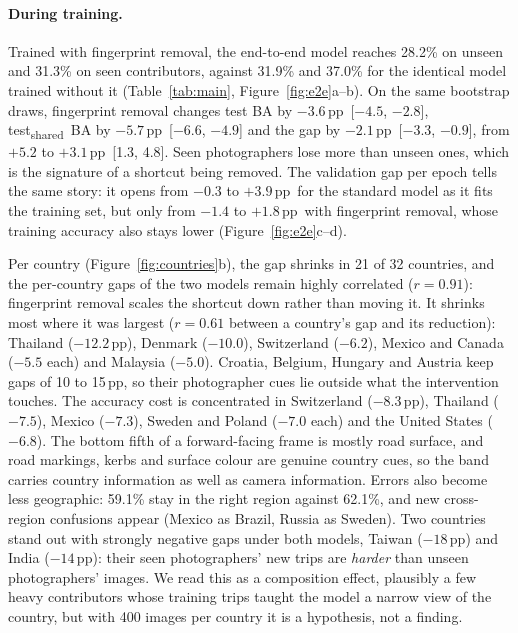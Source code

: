 \documentclass[clean,twocolumn]{bam-project}
\newcommand{\tsh}{test\textsubscript{shared}}
\newcommand{\pp}{\,pp}
\begin{document}
\paragraph{During training.} Trained with fingerprint removal, the end-to-end model reaches 28.2\% on
unseen and 31.3\% on seen contributors, against 31.9\% and 37.0\% for the identical model trained without
it (Table~\ref{tab:main}, Figure~\ref{fig:e2e}a--b). On the same bootstrap draws, fingerprint removal changes
test BA by $-3.6$\pp\ [$-4.5$, $-2.8$], \tsh\ BA by $-5.7$\pp\ [$-6.6$, $-4.9$] and the gap by $-2.1$\pp\
[$-3.3$, $-0.9$], from $+5.2$ to $+3.1$\pp\ [1.3, 4.8]. Seen photographers lose more than unseen ones, which is
the signature of a shortcut being removed. The validation gap per epoch tells the same story: it opens
from $-0.3$ to $+3.9$\pp\ for the standard model as it fits the training set, but only from $-1.4$ to
$+1.8$\pp\ with fingerprint removal, whose training accuracy also stays lower (Figure~\ref{fig:e2e}c--d).

Per country (Figure~\ref{fig:countries}b), the gap shrinks in 21 of 32 countries, and the per-country gaps
of the two models remain highly correlated ($r=0.91$): fingerprint removal scales the shortcut down rather
than moving it. It shrinks most where it was largest ($r=0.61$ between a country's gap and its reduction):
Thailand ($-12.2$\pp), Denmark ($-10.0$), Switzerland ($-6.2$), Mexico and Canada ($-5.5$ each) and Malaysia
($-5.0$). Croatia, Belgium, Hungary and Austria keep gaps of 10 to 15\pp, so their photographer cues lie
outside what the intervention touches. The accuracy cost is concentrated in Switzerland ($-8.3$\pp),
Thailand ($-7.5$), Mexico ($-7.3$), Sweden and Poland ($-7.0$ each) and the United States ($-6.8$). The bottom
fifth of a forward-facing frame is mostly road surface, and road markings, kerbs and surface colour are
genuine country cues, so the band carries country information as well as camera information. Errors also
become less geographic: 59.1\% stay in the right region against 62.1\%, and new cross-region confusions
appear (Mexico as Brazil, Russia as Sweden). Two countries stand out with strongly negative gaps under
both models, Taiwan ($-18$\pp) and India ($-14$\pp): their seen photographers' new trips are \emph{harder}
than unseen photographers' images. We read this as a composition effect, plausibly a few heavy
contributors whose training trips taught the model a narrow view of the country, but with 400 images per
country it is a hypothesis, not a finding.
\end{document}
